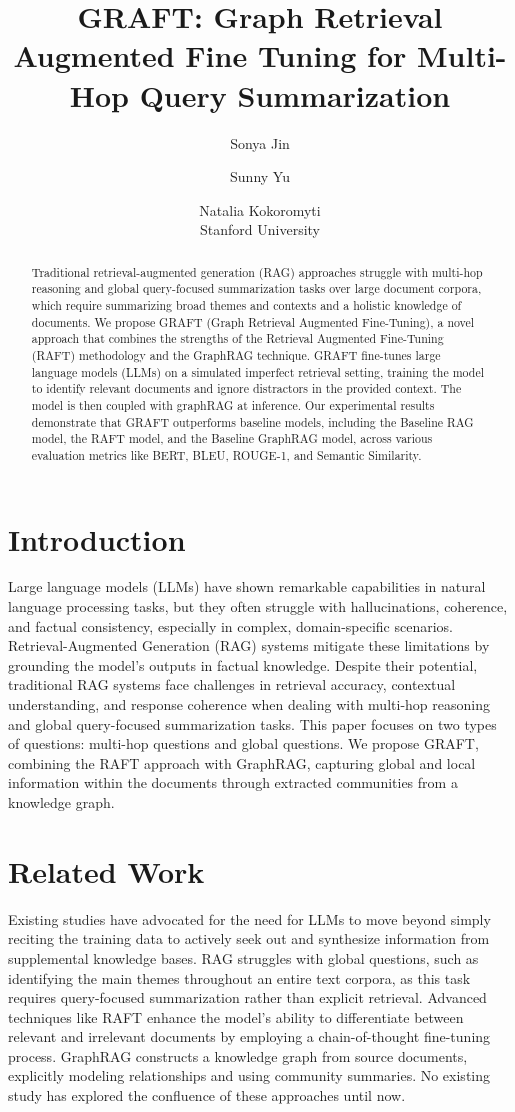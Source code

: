 \documentclass{article}
\title{GRAFT: Graph Retrieval Augmented Fine Tuning for Multi-Hop Query Summarization}
\author{Sonya Jin \and Sunny Yu \and Natalia Kokoromyti \\ Stanford University}
\date{}
\begin{document}
\maketitle

\begin{abstract}
Traditional retrieval-augmented generation (RAG) approaches struggle with multi-hop reasoning and global query-focused summarization tasks over large document corpora, which require summarizing broad themes and contexts and a holistic knowledge of documents. We propose GRAFT (Graph Retrieval Augmented Fine-Tuning), a novel approach that combines the strengths of the Retrieval Augmented Fine-Tuning (RAFT) methodology and the GraphRAG technique. GRAFT fine-tunes large language models (LLMs) on a simulated imperfect retrieval setting, training the model to identify relevant documents and ignore distractors in the provided context. The model is then coupled with graphRAG at inference. Our experimental results demonstrate that GRAFT outperforms baseline models, including the Baseline RAG model, the RAFT model, and the Baseline GraphRAG model, across various evaluation metrics like BERT, BLEU, ROUGE-1, and Semantic Similarity.
\end{abstract}

\section{Introduction}
Large language models (LLMs) have shown remarkable capabilities in natural language processing tasks, but they often struggle with hallucinations, coherence, and factual consistency, especially in complex, domain-specific scenarios. Retrieval-Augmented Generation (RAG) systems mitigate these limitations by grounding the model's outputs in factual knowledge. Despite their potential, traditional RAG systems face challenges in retrieval accuracy, contextual understanding, and response coherence when dealing with multi-hop reasoning and global query-focused summarization tasks. This paper focuses on two types of questions: multi-hop questions and global questions. We propose GRAFT, combining the RAFT approach with GraphRAG, capturing global and local information within the documents through extracted communities from a knowledge graph. 

\section{Related Work}
Existing studies have advocated for the need for LLMs to move beyond simply reciting the training data to actively seek out and synthesize information from supplemental knowledge bases. RAG struggles with global questions, such as identifying the main themes throughout an entire text corpora, as this task requires query-focused summarization rather than explicit retrieval. Advanced techniques like RAFT enhance the model's ability to differentiate between relevant and irrelevant documents by employing a chain-of-thought fine-tuning process. GraphRAG constructs a knowledge graph from source documents, explicitly modeling relationships and using community summaries. No existing study has explored the confluence of these approaches until now.
\end{document}
